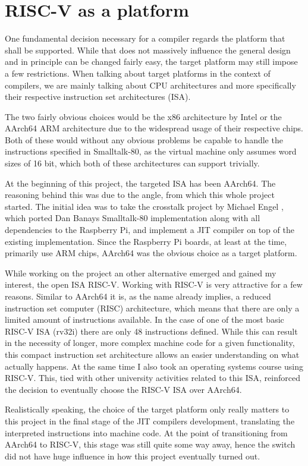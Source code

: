 \chapter{RISC-V as a platform}\label{cha:riscV}

One fundamental decision necessary for a \jit{} compiler regards the platform that shall be supported. 
While that does not massively influence the general design and in principle can be changed fairly easy, the target platform may still impose a few restrictions. 
When talking about target platforms in the context of compilers, we are mainly talking about CPU architectures and more specifically their respective instruction set architectures (ISA). 

The two fairly obvious choices would be the x86 architecture by Intel or the AArch64 ARM architecture due to the widespread usage of their respective chips. 
Both of these would without any obvious problems be capable to handle the instructions specified in Smalltalk-80, as the virtual machine only assumes word sizes of 16 bit, which both of these architectures can support trivially. 

At the beginning of this project, the targeted ISA has been AArch64. The reasoning behind this was due to the angle, from which this whole project started. 
The initial idea was to take the crosstalk project by Michael Engel \cite{crosstalk}, which ported Dan Banays Smalltalk-80 implementation \cite{dbanayST} along with all dependencies to the Raspberry Pi, and implement a JIT compiler on top of the existing implementation.
Since the Raspberry Pi boards, at least at the time, primarily use ARM chips, AArch64 was the obvious choice as a target platform. 

While working on the project an other alternative emerged and gained my interest, the open ISA RISC-V.
Working with RISC-V is very attractive for a few reasons. 
Similar to AArch64 it is, as the name already implies, a reduced instruction set computer (RISC) architecture, which means that there are only a limited amount of instructions available.
In the case of one of the most basic RISC-V ISA (rv32i) there are only 48 instructions defined.
While this can result in the necessity of longer, more complex machine code for a given functionality, this compact instruction set architecture allows an easier understanding on what actually happens.
At the same time I also took an operating systems course using RISC-V.
This, tied with other university activities related to this ISA, reinforced the decision to eventually choose the RISC-V ISA over AArch64. 

Realistically speaking, the choice of the target platform only really matters to this project in the final stage of the JIT compilers development, translating the interpreted instructions into machine code.
At the point of transitioning from AArch64 to RISC-V, this stage was still quite some way away, hence the switch did not have huge influence in how this project eventually turned out.

